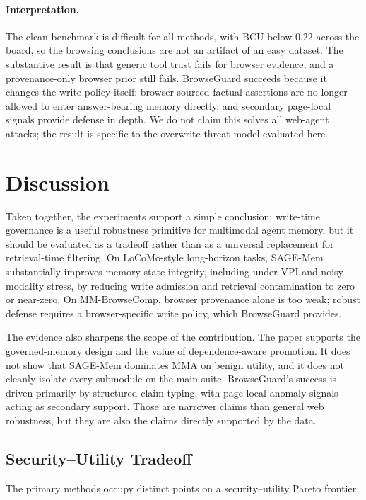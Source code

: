 \documentclass{article}
\begin{document}
\paragraph{Interpretation.}
The clean benchmark is difficult for all methods, with BCU below 0.22 across the board, so the browsing conclusions are not an artifact of an easy dataset. The substantive result is that generic tool trust fails for browser evidence, and a provenance-only browser prior still fails. BrowseGuard succeeds because it changes the write policy itself: browser-sourced factual assertions are no longer allowed to enter answer-bearing memory directly, and secondary page-local signals provide defense in depth. We do not claim this solves all web-agent attacks; the result is specific to the overwrite threat model evaluated here.



\section{Discussion}

Taken together, the experiments support a simple conclusion: write-time governance is a useful robustness primitive for multimodal agent memory, but it should be evaluated as a tradeoff rather than as a universal replacement for retrieval-time filtering. On LoCoMo-style long-horizon tasks, SAGE-Mem substantially improves memory-state integrity, including under VPI and noisy-modality stress, by reducing write admission and retrieval contamination to zero or near-zero. On MM-BrowseComp, browser provenance alone is too weak; robust defense requires a browser-specific write policy, which BrowseGuard provides.

The evidence also sharpens the scope of the contribution. The paper supports the governed-memory design and the value of dependence-aware promotion. It does not show that SAGE-Mem dominates MMA on benign utility, and it does not cleanly isolate every submodule on the main suite. BrowseGuard's success is driven primarily by structured claim typing, with page-local anomaly signals acting as secondary support. Those are narrower claims than general web robustness, but they are also the claims directly supported by the data.

\subsection{Security--Utility Tradeoff}

The primary methods occupy distinct points on a security--utility Pareto frontier.
\end{document}
